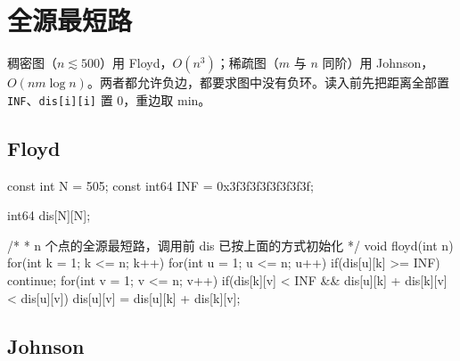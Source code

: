 \section{全源最短路}
稠密图（\(n \lesssim 500\)）用 Floyd，\(O(n^3)\)；稀疏图（\(m\) 与 \(n\) 同阶）用 Johnson，\(O(nm\log n)\)。两者都允许负边，都要求图中没有负环。读入前先把距离全部置 \texttt{INF}、\texttt{dis{[}i{]}{[}i{]}} 置 0，重边取 min。

\subsection{Floyd}\label{floyd}


\begin{codeline}
const int N = 505;
const int64 INF = 0x3f3f3f3f3f3f3f3f;

int64 dis[N][N];

/*
 * n 个点的全源最短路，调用前 dis 已按上面的方式初始化
 */
void floyd(int n) {
    for(int k = 1; k <= n; k++) {
        for(int u = 1; u <= n; u++) {
            if(dis[u][k] >= INF) {
                continue;
            }
            for(int v = 1; v <= n; v++) {
                if(dis[k][v] < INF && dis[u][k] + dis[k][v] < dis[u][v]) {
                    dis[u][v] = dis[u][k] + dis[k][v];
                }
            }
        }
    }
}
\end{codeline}


\subsection{Johnson}\label{johnson}


